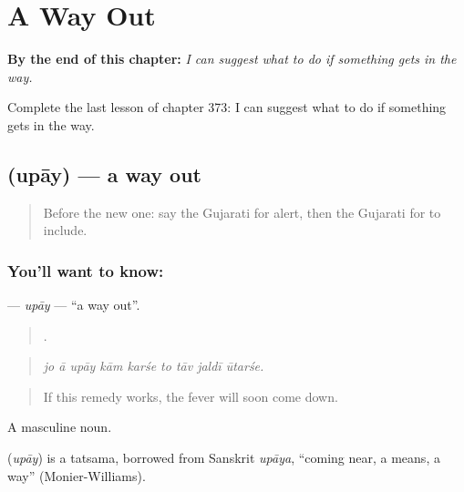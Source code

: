 
\chapter{A Way Out}
\label{ch:gu-a-way-out}

\begin{chapteropening}
\textbf{By the end of this chapter:} \emph{I can suggest what to do if something gets in the way.}

Complete the last lesson of chapter 373: I can suggest what to do if something gets in the way.
\end{chapteropening}

\section[\texorpdfstring{\gu{ઉપાય} (upāy)}{ઉપાય (upāy)}]{ (upāy) — a way out}

\label{lesson:GU-C373-upay}



\begin{quote}
Before the new one: say the Gujarati for alert, then the Gujarati for to include.
\end{quote}

\subsection*{You'll want to know: }
\textbf{} — \emph{upāy} — \textquotedblleft{}a way out\textquotedblright{}.

\begin{quote}
        .
\end{quote}

\begin{quote}
\emph{jo ā upāy kām karśe to tāv jaldī ūtarśe.}
\end{quote}

\begin{quote}
If this remedy works, the fever will soon come down.
\end{quote}

A masculine noun.

\begin{cousinweb}
\textbf{} (\emph{upāy}) is a tatsama, borrowed from Sanskrit \emph{upāya}, \textquotedblleft{}coming near, a means, a way\textquotedblright{} (Monier-Williams).
\end{cousinweb}

